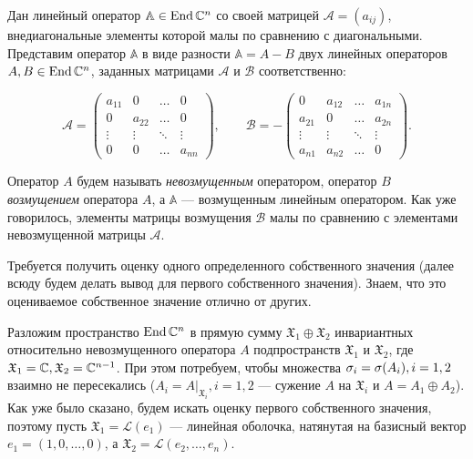 Дан линейный оператор $\mathbb{A} \in \operatorname{End}\mathbb{C}^n$ со своей матрицей $\mathscr{A} = \left( a_{ij} \right)$, внедиагональные элементы которой малы по сравнению с диагональными. Представим оператор $\mathbb{A}$ в виде разности $\mathbb{A} = A-B$ двух линейных операторов $A, B \in \operatorname{End}\mathbb{C}^n$, заданных матрицами $\mathcal{A} \text{ и } \mathcal{B}$ соответственно:

$$
	\mathcal{A} = \begin{pmatrix}
		a_{11} & 0      & \dots  & 0      \\
		0      & a_{22} & \dots  & 0      \\
		\vdots & \vdots & \ddots & \vdots \\
		0      & 0      & \dots  & a_{nn}
	\end{pmatrix},
	\qquad
	\mathcal{B} = -\begin{pmatrix}
		0      & a_{12} & \dots  & a_{1n} \\
		a_{21} & 0      & \dots  & a_{2n} \\
		\vdots & \vdots & \ddots & \vdots \\
		a_{n1} & a_{n2} & \dots  & 0
	\end{pmatrix}.
$$

Оператор $A$ будем называть {\em невозмущенным} оператором, оператор $B$ {\em возмущением} оператора $A$, а $\mathbb{A}$ --- возмущенным линейным оператором. Как уже говорилось, элементы матрицы возмущения $\mathcal{B}$ малы по сравнению с элементами невозмущенной матрицы $\mathcal{A}$.

Требуется получить оценку одного определенного собственного значения (далее всюду будем делать вывод для первого собственного значения). Знаем, что это оцениваемое собственное значение отлично от других.

Разложим пространство $\operatorname{End}\mathbb{C}^n$ в прямую сумму $\mathfrak{X}_1 \oplus \mathfrak{X}_2$ инвариантных относительно невозмущенного оператора $A$ подпространств $\mathfrak{X}_1$ и $\mathfrak{X}_2$, где $\mathfrak{X}_1 = \mathbb{C}, \mathfrak{X}_2 = \mathbb{C}^{n-1}$. При этом потребуем, чтобы множества $\sigma_i = \sigma(A_i),\\ i=1,2$ взаимно не пересекались ($A_i = \left. A \right|_{\mathfrak{X}_i}, i=1,2$ --- сужение $A$ на $\mathfrak{X}_i$ и $A = A_1 \oplus A_2$). Как уже было сказано, будем искать оценку первого собственного значения, поэтому пусть $\mathfrak{X}_1 = \mathcal{L}(e_1)$ --- линейная оболочка, натянутая на базисный вектор $e_1 = (1,0, \dots, 0)$, а $\mathfrak{X}_2 = \mathcal{L}(e_2, \dots, e_n)$.

